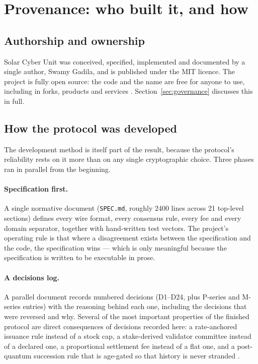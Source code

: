 \documentclass{article}
\begin{document}
\section{Provenance: who built it, and how}
\label{sec:provenance}

\subsection{Authorship and ownership}

Solar Cyber Unit was conceived, specified, implemented and documented by a single author,
Swamy Gadila, and is published under the MIT licence.
The project is fully open source: the code and the name are free for anyone to
use, including in forks, products and services
\cite{srct-repo,srct-readiness}. Section~\ref{sec:governance} discusses this in full.

\subsection{How the protocol was developed}

The development method is itself part of the result, because the protocol's
reliability rests on it more than on any single cryptographic choice. Three
phases ran in parallel from the beginning.

\paragraph{Specification first.} A single normative document (\texttt{SPEC.md},
roughly 2400 lines across 21 top-level sections) defines every wire format,
every consensus rule, every fee and every domain separator, together with
hand-written test vectors. The project's operating rule is that where a
disagreement exists between the specification and the code, the specification
wins --- which is only meaningful because the specification is written to be
executable in prose.

\paragraph{A decisions log.} A parallel document records numbered decisions
(D1--D24, plus P-series and M-series entries) with the reasoning behind each
one, including the decisions that were reversed and why. Several of the most
important properties of the finished protocol are direct consequences of
decisions recorded here: a rate-anchored issuance rule instead of a stock cap,
a stake-derived validator committee instead of a declared one, a proportional
settlement fee instead of a flat one, and a post-quantum succession rule that
is age-gated so that history is never stranded \cite{srct-decisions}.
\end{document}
